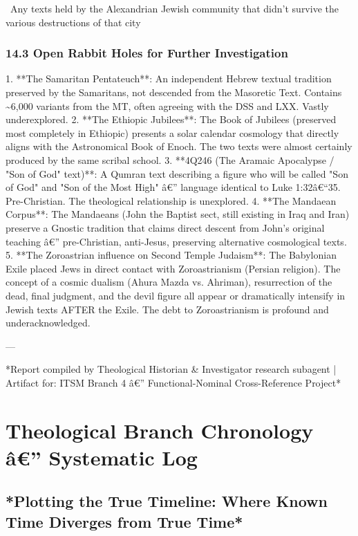 \documentclass[aps,prd,11pt,onecolumn,superscriptaddress,nofootinbib,floatfix]{revtex4-2}
\begin{document}
\textbullet~Any texts held by the Alexandrian Jewish community that didn't survive the various destructions of that city



\subsubsection{14.3 Open Rabbit Holes for Further Investigation}


1. **The Samaritan Pentateuch**: An independent Hebrew textual tradition preserved by the Samaritans, not descended from the Masoretic Text. Contains \textasciitilde{}6,000 variants from the MT, often agreeing with the DSS and LXX. Vastly underexplored.
2. **The Ethiopic Jubilees**: The Book of Jubilees (preserved most completely in Ethiopic) presents a solar calendar cosmology that directly aligns with the Astronomical Book of Enoch. The two texts were almost certainly produced by the same scribal school.
3. **4Q246 (The Aramaic Apocalypse / "Son of God" text)**: A Qumran text describing a figure who will be called "Son of God" and "Son of the Most High" â€'' language identical to Luke 1:32â€``35. Pre-Christian. The theological relationship is unexplored.
4. **The Mandaean Corpus**: The Mandaeans (John the Baptist sect, still existing in Iraq and Iran) preserve a Gnostic tradition that claims direct descent from John's original teaching â€'' pre-Christian, anti-Jesus, preserving alternative cosmological texts.
5. **The Zoroastrian influence on Second Temple Judaism**: The Babylonian Exile placed Jews in direct contact with Zoroastrianism (Persian religion). The concept of a cosmic dualism (Ahura Mazda vs. Ahriman), resurrection of the dead, final judgment, and the devil figure all appear or dramatically intensify in Jewish texts AFTER the Exile. The debt to Zoroastrianism is profound and underacknowledged.


---


*Report compiled by Theological Historian \& Investigator research subagent | Artifact for: ITSM Branch 4 â€'' Functional-Nominal Cross-Reference Project*
\section{Theological Branch Chronology â€'' Systematic Log}
\subsection{*Plotting the True Timeline: Where Known Time Diverges from True Time*}
\end{document}
